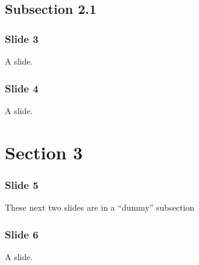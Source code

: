 \documentclass[t,english]{beamer}
\begin{document}

\subsection*{Subsection 2.1}

\begin{frame}[fragile]
\frametitle{Slide 3}


A slide.
\end{frame}

\begin{frame}[fragile]
\frametitle{Slide 4}


A slide.
\end{frame}



\section*{Section 3}

\begin{frame}[fragile]
\frametitle{Slide 5}


These next two slides are in a ``dummy'' subsection
\end{frame}

\begin{frame}[fragile]
\frametitle{Slide 6}


A slide.
\end{frame}
\end{document}
